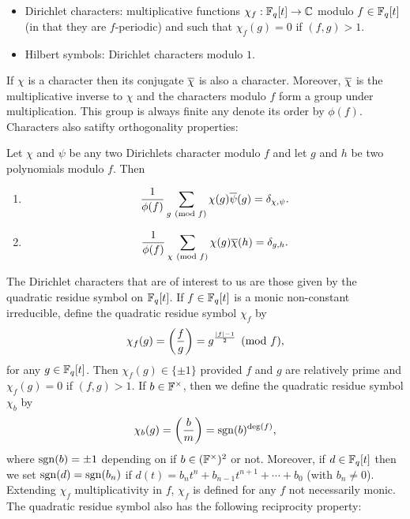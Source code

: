 \documentclass[12pt,reqno,oneside]{amsart}
\begin{document}
    \begin{itemize}
        \item Dirichlet characters: multiplicative functions $\chi_{f}:\mathbb{F}_{q}[t] \to \mathbb{C}$ modulo $f \in \mathbb{F}_{q}[t]$ (in that they are $f$-periodic) and such that $\chi_{f}(g) = 0$ if $(f,g) > 1$.
        \item Hilbert symbols: Dirichlet characters modulo $1$.
    \end{itemize}
    
    If $\chi$ is a character then its conjugate $\overline{\chi}$ is also a character. Moreover, $\overline{\chi}$ is the multiplicative inverse to $\chi$ and the characters modulo $f$ form a group under multiplication. This group is always finite any denote its order by $\phi(f)$. Characters also satifty orthogonality properties:

    \begin{theorem}
        Let $\chi$ and $\psi$ be any two Dirichlets character modulo $f$ and let $g$ and $h$ be two polynomials modulo $f$. Then
        \begin{enumerate}[label=(\roman*)]
          \item
          \[
            \frac{1}{\phi(f)}\sum_{g \ \left(\text{mod }f\right)}\chi(g)\overline{\psi}(g) = \delta_{\chi,\psi}.
          \]
          \item
          \[
            \frac{1}{\phi(f)}\sum_{\chi \ \left(\text{mod }f\right)}\chi(g)\overline{\chi}(h) = \delta_{g,h}.
          \]
        \end{enumerate}
    \end{theorem}

    The Dirichlet characters that are of interest to us are those given by the quadratic residue symbol on $\mathbb{F}_{q}[t]$. If $f \in \mathbb{F}_{q}[t]$ is a monic non-constant irreducible, define the quadratic residue symbol $\chi_{f}$ by
    \[
        \chi_{f}(g) = \left(\frac{f}{g}\right) = g^{\frac{|f|-1}{2}} \pmod{f},
    \]
    for any $g \in \mathbb{F}_{q}[t]$. Then $\chi_{f}(g) \in \{\pm 1\}$ provided $f$ and $g$ are relatively prime and $\chi_{f}(g) = 0$ if $(f,g) > 1$. If $b \in \mathbb{F}^{\times}$, then we define the quadratic residue symbol $\chi_{b}$ by
    \[
        \chi_{b}(g) = \left(\frac{b}{m}\right) = \operatorname{\mathrm{sgn}}(b)^{\deg(f)},
    \]
    where $\operatorname{\mathrm{sgn}}(b) = \pm1$ depending on if $b \in (\mathbb{F}^{\times})^{2}$ or not. Moreover, if $d \in \mathbb{F}_{q}[t]$ then we set $\operatorname{\mathrm{sgn}}(d) = \operatorname{\mathrm{sgn}}(b_{n})$ if $d(t) = b_{n}t^{n}+b_{n-1}t^{n+1}+\cdots+b_{0}$ (with $b_{n} \neq 0$). Extending $\chi_{f}$ multiplicativity in $f$, $\chi_{f}$ is defined for any $f$ not necessarily monic. The quadratic residue symbol also has the following reciprocity property:
\end{document}
